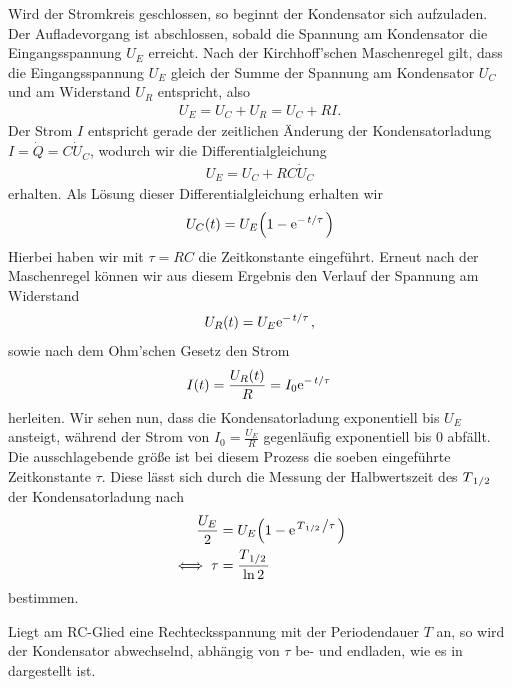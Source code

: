 Wird der Stromkreis geschlossen, so beginnt der Kondensator sich aufzuladen. Der Aufladevorgang ist abschlossen, sobald die Spannung am Kondensator die Eingangsspannung $U_E$ erreicht. Nach der Kirchhoff'schen Maschenregel gilt, dass die Eingangsspannung $U_E$ gleich der Summe der Spannung am Kondensator $U_C$ und am Widerstand $U_R$ entspricht, also
\begin{align}
  U_E = U_C + U_R = U_C + R I.
\end{align}
Der Strom $I$ entspricht gerade der zeitlichen Änderung der Kondensatorladung $I = \dot{Q} = C \dot{U}_C$, wodurch wir die Differentialgleichung
\begin{align}
  U_E = U_C + RC \dot{U}_C
\end{align}
erhalten. Als Lösung dieser Differentialgleichung erhalten wir
\begin{align}
  U_C(t) = U_E\qty(1 - \e{-\flatfrac{t}{\tau}})
\end{align}
Hierbei haben wir mit $\tau = RC$ die Zeitkonstante eingeführt. Erneut nach der Maschenregel können wir aus diesem Ergebnis den Verlauf der Spannung am Widerstand
\begin{align}
  U_R(t) = U_E\e{-\flatfrac{t}{\tau}},
\end{align}
sowie nach dem Ohm'schen Gesetz den Strom
\begin{align}
  I(t) = \frac{U_R(t)}{R} = I_0\e{-\flatfrac{t}{\tau}}
\end{align} 
herleiten. Wir sehen nun, dass die Kondensatorladung exponentiell bis $U_E$ ansteigt, während der Strom von $I_0 = \frac{U_E}{R}$ gegenläufig exponentiell bis $0$ abfällt. Die ausschlagebende größe ist bei diesem Prozess die soeben eingeführte Zeitkonstante $\tau$. Diese lässt sich durch die Messung der Halbwertszeit des $T_{\flatfrac{1}{2}}$ der Kondensatorladung nach 
\begin{align}
  \frac{U_E}{2} &= U_E\qty(1 - \e{\flatfrac{T_{\ffrac{1}{2}}}{\tau}})\\
  \iff \tau &= \frac{\Thalf}{\ln 2}
\end{align}
bestimmen.

Liegt am RC-Glied eine Rechtecksspannung mit der Periodendauer $T$ an, so wird der Kondensator abwechselnd, abhängig von $\tau$ be- und endladen, wie es in  dargestellt ist.


